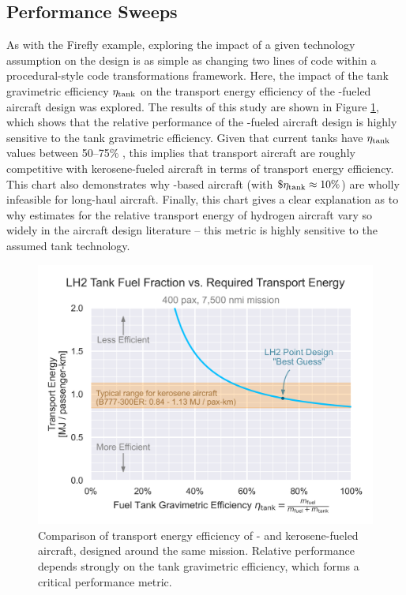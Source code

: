\subsection{Performance Sweeps}

As with the Firefly example, exploring the impact of a given technology assumption on the design is as simple as changing two lines of code within a procedural-style code transformations framework. Here, the impact of the tank gravimetric efficiency $\eta_{\rm tank}$ on the transport energy efficiency of the \lh-fueled aircraft design was explored. The results of this study are shown in Figure \ref{fig:transport_energy}, which shows that the relative performance of the \lh-fueled aircraft design is highly sensitive to the tank gravimetric efficiency. Given that current tanks have $\eta_{\rm tank}$ values between 50--75\% \cite{brewer_hydrogen_1991}, this implies that \lh transport aircraft are roughly competitive with kerosene-fueled aircraft in terms of transport energy efficiency. This chart also demonstrates why \gh-based aircraft (with $\$\eta_{\rm tank} \approx 10\%$) are wholly infeasible for long-haul aircraft. Finally, this chart gives a clear explanation as to why estimates for the relative transport energy of hydrogen aircraft vary so widely in the aircraft design literature -- this metric is highly sensitive to the assumed tank technology.

\begin{figure}[h]
    \centering
    \includegraphics[width=\textwidth]{../figures/Hydrogen/ppt/media/image28.png}
    \caption{Comparison of transport energy efficiency of \lh- and kerosene-fueled aircraft, designed around the same mission. Relative performance depends strongly on the \lh tank gravimetric efficiency, which forms a critical performance metric.}
    \label{fig:transport_energy}
\end{figure}

